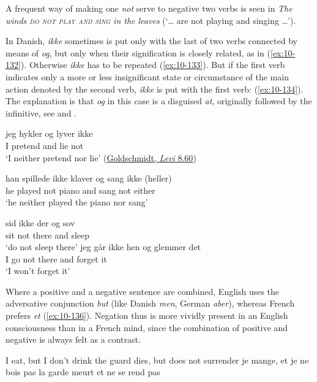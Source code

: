 A frequent way of making one \textit{not} serve to negative two verbs is seen in \textit{The winds \textsc{do not play and sing} in the leaves} (`{\dots} are not playing and singing {\dots}'). 

In Danish, \textit{ikke} sometimes is put only with the last of two verbs connected by means of \textit{og}, but only when their signification is closely related, as in (\ref{ex:10-132}). Otherwise \textit{ikke} has to be repeated (\ref{ex:10-133}). But if the first verb indicates only a more or less insignificant state or circumstance of the main action denoted by the second verb, \textit{ikke} is put with the first verb: (\ref{ex:10-134}). The explanation is that \textit{og} in this case is a disguised \textit{at}, originally followed by the infinitive, see \citet[\href{https://archive.org/details/dania_202407/page/166/mode/2up?view=theater}{167ff}]{jespersen1896dare} and \citet[\href{https://archive.org/details/dania_202407/page/248/mode/2up?view=theater}{249ff}]{siesbye1896bemerkninger}.

\ea\label{ex:10-132}
\gll jeg hykler og lyver ikke\\
 I pretend and lie not\\
\glt `I neither pretend nor lie'
\hfill(\href{https://archive.org/details/mgoldschmidtspo00unkngoog/page/n74/mode/2up?q=%22jeg+hykler+og+lyver+ikke%22&view=theater}{Goldschmidt, \textit{Levi} 8.60})
\z



\ea \label{ex:10-133}
\gll han spillede ikke klaver og sang ikke (heller)\\
 he played not piano and sang not either\\
\glt `he neither played the piano nor sang' %
\z

\ea \label{ex:10-134}
\ea
\gll sid ikke der og sov\\
 sit not there and sleep\\
\glt `do not sleep there'
\ex
\gll jeg går ikke hen og glemmer det\\
 I go not there and forget it\\
\glt `I won't forget it'
\z
\z

Where a positive and a negative sentence are combined, English uses the adversative conjunction \textit{but} (like Danish \textit{men}, German \textit{aber}), whereas French prefers \textit{et} (\ref{ex:10-136}). Negation thus is more vividly present in an English consciousness than in a French mind, since the combination of positive and negative is always felt as a contrast.

\ea \label{ex:10-136}
 \ea
 \ea I eat, but I don't drink
 \ex  the guard dies, but does not surrender 
 \z
\ex
 \ea je mange, et je ne bois pas
 \ex
 la garde meurt et ne se rend pas 
 \z
 \z
\z
{}
